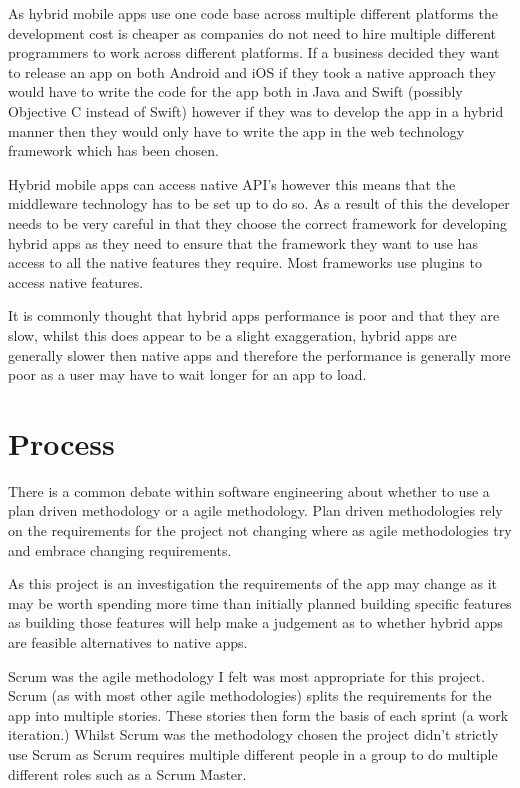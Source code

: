 As hybrid mobile apps use one code base across multiple different platforms the development cost is cheaper as companies do not need to hire multiple different programmers to work across different platforms. If a business decided they want to release an app on both Android and iOS if they took a native approach they would have to write the code for the app both in Java and Swift (possibly Objective C instead of Swift) however if they was to develop the app in a hybrid manner then they would only have to write the app in the web technology framework which has been chosen.

Hybrid mobile apps can access native API's however this means that the middleware technology has to be set up to do so. As a result of this the developer needs to be very careful in that they choose the correct framework for developing hybrid apps as they need to ensure that the framework they want to use has access to all the native features they require. Most frameworks use plugins to access native features.

It is commonly thought that hybrid apps performance is poor and that they are slow, whilst this does appear to be a slight exaggeration, hybrid apps are generally slower then native apps and therefore the performance is generally more poor as a user may have to wait longer for an app to load.


\section{Process}
There is a common debate within software engineering about whether to use a plan driven methodology or a agile methodology. Plan driven methodologies rely on the requirements for the project not changing where as agile methodologies try and embrace changing requirements.

As this project is an investigation the requirements of the app may change as it may be worth spending more time than initially planned building specific features as building those features will help make a judgement as to whether hybrid apps are feasible alternatives to native apps.

Scrum was the agile methodology I felt was most appropriate for this project. Scrum (as with most other agile methodologies) splits the requirements for the app into multiple stories. These stories then form the basis of each sprint (a work iteration.) Whilst Scrum was the methodology chosen the project didn't strictly use Scrum as Scrum requires multiple different people in a group to do multiple different roles such as a Scrum Master. 

